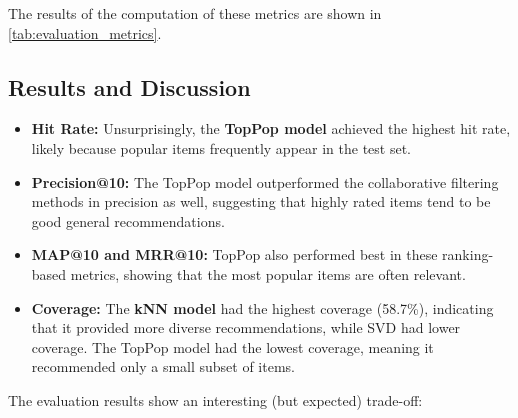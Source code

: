 \documentclass[11pt,a4paper]{article}
\begin{document}
The results of the computation of these metrics are shown in \autoref{tab:evaluation_metrics}.

\begin{table}[H]
    \centering
    \caption{Evaluation Metrics for Top-10 Recommendations \textcolor{red}{on the Test Set (ratings $\geq$ 4 considered relevant)}}
    \label{tab:evaluation_metrics}
\end{table}

\subsection{Results and Discussion}

\begin{itemize}
    \item \textbf{Hit Rate:} Unsurprisingly, the \textbf{TopPop model} achieved the highest hit rate, likely because popular items frequently appear in the test set.
    \item \textbf{Precision@10:} The TopPop model outperformed the collaborative filtering methods in precision as well, suggesting that highly rated items tend to be good general recommendations.
    \item \textbf{MAP@10 and MRR@10:} TopPop also performed best in these ranking-based metrics, showing that the most popular items are often relevant.
    \item \textbf{Coverage:} The \textbf{kNN model} had the highest coverage (58.7\%), indicating that it provided more diverse recommendations, while SVD had lower coverage. The TopPop model had the lowest coverage, meaning it recommended only a small subset of items.
\end{itemize}

The evaluation results show an interesting (but expected) trade-off:
\end{document}
